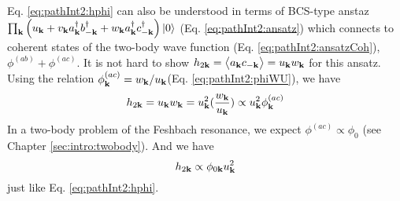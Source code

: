 Eq. \ref{eq:pathInt2:hphi} can also be understood in terms of BCS-type anstaz $\prod_{\mathbf{k}}\left(u_{\mathbf{k}}+v_{\mathbf{k}}{}a^{\dagger}_{\mathbf{k}}{}b^{\dagger}_{-\mathbf{k}}+w_{\mathbf{k}}{}a^{\dagger}_{\mathbf{k}}{}c^{\dagger}_{-\mathbf{k}}\right)\left|0\right>$ (Eq. \ref{eq:pathInt2:ansatz}) which connects to coherent states of the two-body wave function (Eq. \ref{eq:pathInt2:ansatzCoh}), $\phi^{(ab)}+\phi^{(ac)}$.   It is not hard to show  $h_{2\mathbf{k}}=\bigl<{a_{\mathbf{k}}c_{-\mathbf{k}}}\bigr>=u_{\mathbf{k}}w_{\mathbf{k}}$ for this ansatz. Using the relation $\phi^{(ac)}_{\mathbf{k}}=w_{\mathbf{k}}/u_{\mathbf{k}}$(Eq. \ref{eq:pathInt2:phiWU}),  we have
\begin{equation}
h_{2\mathbf{k}}=u_{\mathbf{k}}w_{\mathbf{k}}=u_{\mathbf{k}}^{2}(\frac{w_{\mathbf{k}}}{u_{\mathbf{k}}})\propto{}u_{\mathbf{k}}^{2}\phi^{(ac)}_{\mathbf{k}}
\end{equation}
 In a two-body problem of the Feshbach resonance, we expect $\phi^{(ac)}\propto\phi_{0}$  (see Chapter \ref{sec:intro:twobody}).
 And we have 
 \begin{equation}
 h_{2\mathbf{k}}\propto\phi_{0\mathbf{k}}u_{\mathbf{k}}^{2}
 \end{equation}
just like Eq. \ref{eq:pathInt2:hphi}.




